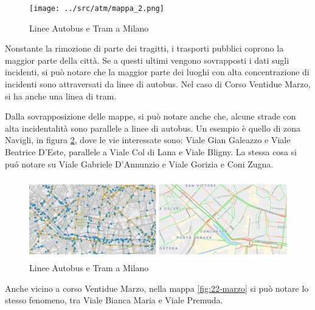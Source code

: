 \documentclass[a4paper]{report}
\begin{document}
\begin{figure}
    \texttt{[image: ../src/atm/mappa\_2.png]}
    \caption{Linee Autobus e Tram a Milano}
    \label{fig:geo-trasporti}
\end{figure}

Nonstante la rimozione di parte dei tragitti, i trasporti pubblici coprono 
la maggior parte della città.
Se a questi ultimi vengono sovrapposti i dati sugli incidenti, 
si può notare che la maggior parte dei luoghi con alta concentrazione di incidenti sono 
attraversati da linee di autobus. Nel caso di Corso Ventidue Marzo, si ha anche una linea di tram.




Dalla sovrapposizione delle mappe, si può notare anche che, alcune strade con alta incidentalità 
sono parallele a linee di autobus. 
Un esempio è quello di zona Navigli, in figura \ref{fig:navigli}, dove le vie interessate sono:
Viale Gian Galeazzo e Viale Beatrice D'Este, parallele a Viale Col di Lana e Viale Bligny.
La stessa cosa si pu\'o notare su Viale Gabriele D'Annunzio e Viale Gorizia e Coni Zugna.

\begin{figure}
    \includegraphics[width=\linewidth]{../src/atm/navigli.png}
    \caption{Linee Autobus e Tram a Milano}
    \label{fig:navigli}
\end{figure}

Anche vicino a corso Ventidue Marzo, nella mappa \ref{fig:22-marzo} si può 
notare lo stesso fenomeno, tra Viale Bianca Maria e Viale Premuda.
\end{document}
